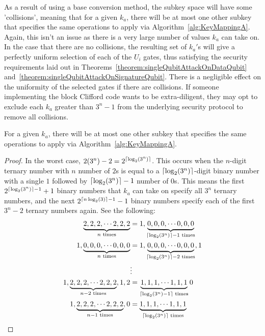 As a result of using a base conversion method, the subkey space will have some 'collisions', meaning that for a given $k_a$, there will be at most one other subkey that specifies the same operations to apply via Algorithm~\ref{alg:KeyMappingA}. Again, this isn't an issue as there is a very large number of values $k_a$ can take on. In the case that there are no collisions, the resulting set of $k_a'$s will give a perfectly uniform selection of each of the $U_i$ gates, thus satisfying the security requirements laid out in Theorems~\ref{theorem:singleQubitAttackOnDataQubit} and~\ref{theorem:singleQubitAttackOnSignatureQubit}. There is a negligible effect on the uniformity of the selected gates if there are collisions. If someone implementing the block Clifford code wants to be extra-diligent, they may opt to exclude each $k_a$ greater than $3^n - 1$ from the underlying security protocol to remove all collisions.

\begin{theorem}
\label{theorem:collisionForMappingA}
For a given $k_a$, there will be at most one other subkey that specifies the same operations to apply via Algorithm~\ref{alg:KeyMappingA}.
\end{theorem}
\begin{proof}
In the worst case, $2(3^n) - 2 = 2^{\lceil\log_2 (3^n)\rceil}$. This occurs when the $n$-digit ternary number with $n$ number of $2$s is equal to a $\lceil\log_2 (3^n)\rceil$-digit binary number with a single $1$ followed by $\lceil\log_2 (3^n)\rceil - 1$ number of $0$s. This means the first $2^{\lceil\log_2 (3^n)\rceil - 1} + 1$ binary numbers that $k_a$ can take on specify all $3^n$ ternary numbers, and the next $2^{\lceil n \log_2 (3)\rceil - 1} - 1$ binary numbers specify each of the first $3^n - 2$ ternary numbers again. See the following:
\begin{align}
\underbrace{2, 2, 2, \cdots 2,2,2}_{n \text{ times}} &= 1, \underbrace{0, 0, 0, \cdots 0,0,0}_{\lceil\log_2 (3^n)\rceil - 1 \text{ times}}\\
1,\underbrace{0, 0, 0, \cdots 0,0,0}_{n \text{ times}} &= 1, \underbrace{0, 0, 0, \cdots 0,0,0}_{\lceil\log_2 (3^n)\rceil - 2 \text{ times}}, 1\\
& \vdots \nonumber \\
1, \underbrace{2, 2, 2, \cdots 2,2,2}_{n-2 \text{ times}}, 1,2 &= \underbrace{1, 1, 1, \cdots 1,1,1}_{\lceil\log_2 (3^n) - 1\rceil\text{ times}} 0\\
1, \underbrace{2, 2, 2, \cdots 2,2,2}_{n-1 \text{ times}}, 0 &= \underbrace{1, 1, 1, \cdots 1,1,1}_{\lceil\log_2 (3^n)\rceil\text{ times}}
\end{align}
\end{proof}

